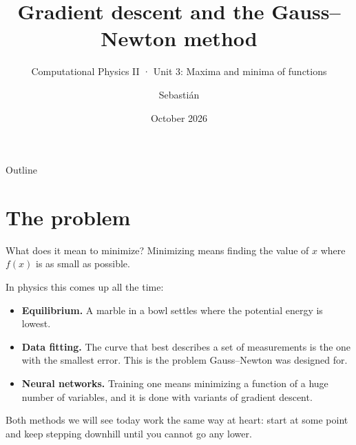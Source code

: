\documentclass[aspectratio=169,10pt]{beamer}
\title{Gradient descent and the Gauss--Newton method}
\subtitle{Computational Physics II \;·\; Unit 3: Maxima and minima of functions}
\author{Sebastián}
\institute{Physics Program, Universidad de Pamplona}
\date{October 2026}
\begin{document}
\maketitle

\begin{frame}{Outline}
  \tableofcontents
\end{frame}

\section{The problem}

\begin{frame}{What does it mean to minimize?}
  Minimizing means finding the value of $x$ where $f(x)$ is as small as possible.
  \medskip

  In physics this comes up all the time:
  \begin{itemize}
    \item \textbf{Equilibrium.} A marble in a bowl settles where the potential energy is lowest.
    \item \textbf{Data fitting.} The curve that best describes a set of measurements is the one with the smallest error. This is the problem Gauss--Newton was designed for.
    \item \textbf{Neural networks.} Training one means minimizing a function of a huge number of variables, and it is done with variants of gradient descent.
  \end{itemize}
  \medskip

  Both methods we will see today work the same way at heart: start at some point and keep stepping downhill until you cannot go any lower.
\end{frame}
\end{document}
